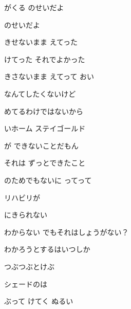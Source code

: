 \documentclass[a4paper,tate,twocolumn,12pt]{ltjtarticle}
\begin{document}
\begin{flushleft}
\begin{minipage}{\linewidth}
がくる のせいだよ

のせいだよ
\end{minipage}

\vspace{2em}

\noindent\begin{minipage}{\linewidth}
きせないまま えてった

けてった それでよかった

きさないまま えてって おい
\end{minipage}

\vspace{2em}

\noindent\begin{minipage}{\linewidth}
なんてしたくないけど

めてるわけではないから

いホーム ステイゴールド

が できないことだもん

それは ずっとできたこと

のためでもないに ってって

リハビリが

にきられない
\end{minipage}

\vspace{2em}

\noindent\begin{minipage}{\linewidth}
わからない でもそれはしょうがない？

わかろうとするはいつしか

つぶつぶとけぶ

シェードのは
\end{minipage}

\vspace{2em}

\noindent\begin{minipage}{\linewidth}
ぶって けてく ぬるい


\end{minipage}
\end{flushleft}
\end{document}
